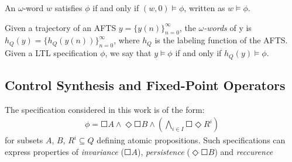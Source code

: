 An $\omega$-word $ w $ satisfies $ \phi $ if and only if $ (w,0)\models \phi $, written as $ w \models \phi $. 

Given a trajectory of an AFTS $ y = \{y(n)\}_{n=0}^{\infty} $, the \textit{$\omega$-words} of y is $ h_Q(y) =  \{h_Q(y(n))\}_{n=0}^{\infty} $, where $ h_Q $ is the labeling function of the AFTS.  Given a LTL specification $ \phi $, we say that $ y\models \phi $ if and only if $ h_Q(y) \models \phi $.

\subsection{Control Synthesis and Fixed-Point Operators}
\label{sec: cont_syn}

The specification considered in this work is of the form:
\begin{align}
\phi = \Square A \wedge \Diamond \Square B \wedge \left( \bigwedge_{i\in I} \Square \Diamond R^i\right)\label{phi}
\end{align}
{\color{purple} for subsets $A$, $B$, $R^i \subseteq Q$ defining atomic propositions. Such specifications can express properties of \emph{invariance} ($\Square A$), \emph{persistence} ($\Diamond \Square B$) and \emph{reccurence}} 

